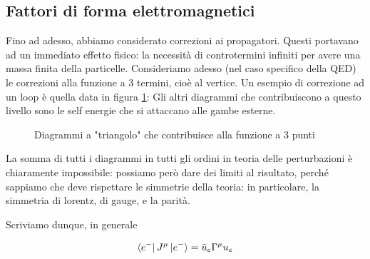 \documentclass[11pt]{report}
\begin{document}
\subsection{Fattori di forma elettromagnetici}

Fino ad adesso, abbiamo considerato correzioni ai propagatori. Questi portavano ad un immediato effetto fisico: la necessità di controtermini infiniti per avere una massa finita della particelle. Consideriamo adesso (nel caso specifico della QED) le correzioni alla funzione a 3 termini, cioè al vertice. Un esempio di correzione ad un loop è quella data in figura \ref{fig:oneloopqedvertex}: Gli altri diagrammi che contribuiscono a questo livello sono le self energie che si attaccano alle gambe esterne.

\begin{figure}
    \caption{Diagrammi a "triangolo" che contribuisce alla funzione a 3 punti}
    \label{fig:oneloopqedvertex}
    \begin{center}
    \end{center}
\end{figure}

La somma di tutti i diagrammi in tutti gli ordini in teoria delle perturbazioni è chiaramente impossibile: possiamo però dare dei limiti al risultato, perché sappiamo che deve rispettare le simmetrie della teoria: in particolare, la simmetria di lorentz, di gauge, e la parità. 

Scriviamo dunque, in generale 

\begin{align}
    \bra{e^-}J^\mu \ket{e^-} = \bar{u}_e \Gamma^\mu u_e
\end{align}
\end{document}
